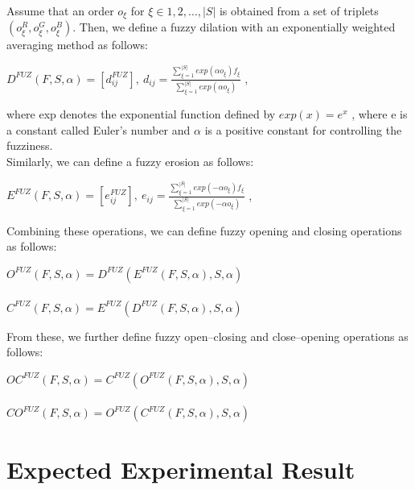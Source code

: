 Assume that an order $o_{\xi}$
 for $\xi\in{1,2,\ldots,|S|}$
 is obtained from a set of triplets $(o_{\xi}^{R}, o_{\xi}^{G}, o_{\xi}^{B})$. Then, we define a fuzzy dilation with an exponentially weighted averaging method as follows:\\
\begin{center}
 $D^{FUZ}(F,S,\alpha) = [d_{ij}^{FUZ}], \  d_{ij}=\frac{\displaystyle\sum_{\xi=1}^{|S|} exp (\alpha o_{\xi})f_{\xi}}{\displaystyle\sum_{\xi=1}^{|S|} exp (\alpha o_{\xi})}$ , \\
 \end{center}
 
 where exp denotes the exponential function defined by $exp(x)=e^{x}$
, where e is a constant called Euler’s number and $\alpha$
 is a positive constant for controlling the fuzziness.\\

 Similarly, we can define a fuzzy erosion as follows:
 \begin{center}
 $E^{FUZ}(F,S,\alpha) = [e_{ij}^{FUZ}], \  e_{ij}=\frac{\displaystyle\sum_{\xi=1}^{|S|} exp (-\alpha o_{\xi})f_{\xi}}{\displaystyle\sum_{\xi=1}^{|S|} exp (-\alpha o_{\xi})}$ , \\
 \end{center}
Combining these operations, we can define fuzzy opening and closing operations as follows:
\begin{center}
$O^{FUZ}(F,S,\alpha)=D^{FUZ}(E^{FUZ}(F,S,\alpha),S,\alpha)$
\\
\ 
\\
$C^{FUZ}(F,S,\alpha)=E^{FUZ}(D^{FUZ}(F,S,\alpha),S,\alpha)$
\end{center}
From these, we further define fuzzy open–closing and close–opening operations as follows:
\begin{center}
$OC^{FUZ}(F,S,\alpha)=C^{FUZ}(O^{FUZ}(F,S,\alpha),S,\alpha)$
\\
\ 
\\
$CO^{FUZ}(F,S,\alpha)=O^{FUZ}(C^{FUZ}(F,S,\alpha),S,\alpha)$
\end{center}


\section*{Expected Experimental Result}


